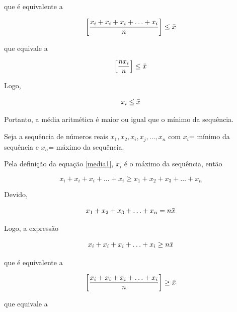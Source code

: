 \begin{enumerate}
que é equivalente a 

\begin{equation*}\label{propriedade1}
\left[ \frac{x_{i}+x_{i}+x_{i}+\ldots+x_{i}}{n}  \right ] \leq \Bar{x}
\end{equation*}

que equivale a 

\begin{equation*}\label{propriedade1}
\left[ \frac{nx_{i}}{n} \right ]  \leq \Bar{x}
\end{equation*}

Logo,

\begin{equation*}\label{propriedade1}
x_{i} \leq \Bar{x}
\end{equation*}

Portanto, a média aritmética é maior ou igual que o mínimo da sequência.



\vskip0.3cm

\textbf{}
\vskip0.3cm

Seja a sequência de números reais $x_{1},x_{2},x_{i},x_{j},\ldots,x_{n}$ com $x_{i}$= mínimo da sequência e $x_{n}$= máximo da sequência. \vskip0.3cm

Pela definição da equação \ref{media1}, $x_{i}$ é o máximo da sequência, então 

\begin{equation*}\label{propriedade1}
x_{i}+x_{i}+x_{i}+\ldots+x_{i} \geq  x_{1}+x_{2}+x_{3}+\ldots+x_{n}
\end{equation*}

Devido,

\begin{equation*}\label{propriedade1}
x_{1}+x_{2}+x_{3}+\ldots+x_{n}=n \Bar{x}
\end{equation*}

Logo, a expressão

\begin{equation*}\label{propriedade1}
x_{i}+x_{i}+x_{i}+\ldots+x_{i} \geq n \Bar{x}
\end{equation*}

que é equivalente a 

\begin{equation*}\label{propriedade1}
\left[ \frac{x_{i}+x_{i}+x_{i}+\ldots+x_{i}}{n} \right ] \geq \Bar{x}
\end{equation*}

que equivale a 


\end{enumerate}
